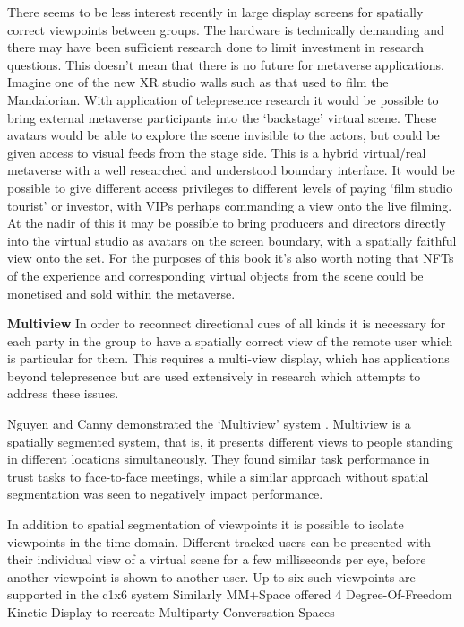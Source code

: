 There seems to be less interest recently in large display screens for spatially correct viewpoints between groups. The hardware is technically demanding and there may have been sufficient research done to limit investment in research questions. This doesn't mean that there is no future for metaverse applications. Imagine one of the new XR studio walls such as that used to film the Mandalorian. With application of telepresence research it would be possible to bring external metaverse participants into the `backstage' virtual scene. These avatars would be able to explore the scene invisible to the actors, but could be given access to visual feeds from the stage side. This is a hybrid virtual/real metaverse with a well researched and understood boundary interface. It would be possible to give different access privileges to different levels of paying `film studio tourist' or investor, with VIPs perhaps commanding a view onto the live filming. At the nadir of this it may be possible to bring producers and directors directly into the virtual studio as avatars on the screen boundary, with a spatially faithful view onto the set. For the purposes of this book it's also worth noting that NFTs of the experience and corresponding virtual objects from the scene could be monetised and sold within the metaverse.\par
\textbf{Multiview}
In order to reconnect directional cues of all kinds it is necessary for each party in the group to have a spatially correct view of the remote user which is particular for them. This requires a multi-view display, which has applications beyond telepresence but are used extensively in research which attempts to address these issues.\par
Nguyen and Canny demonstrated the `Multiview' system \cite{Nguyen2005}. Multiview is a spatially segmented system, that is, it presents different views to people standing in different locations simultaneously. They found similar task performance in trust tasks to face-to-face meetings, while a similar approach without spatial segmentation was seen to negatively impact performance.\par
                    
In addition to spatial segmentation of viewpoints \cite{Gotsch2018} it is possible to isolate viewpoints in the time domain. Different tracked users can be presented with their individual view of a virtual scene for a few milliseconds per eye, before another viewpoint is shown to another user. Up to six such viewpoints are supported in the c1x6 system \cite{Kulik2011}
Similarly MM+Space offered 4 Degree-Of-Freedom Kinetic Display to recreate Multiparty Conversation Spaces \cite{Otsuka2013}
